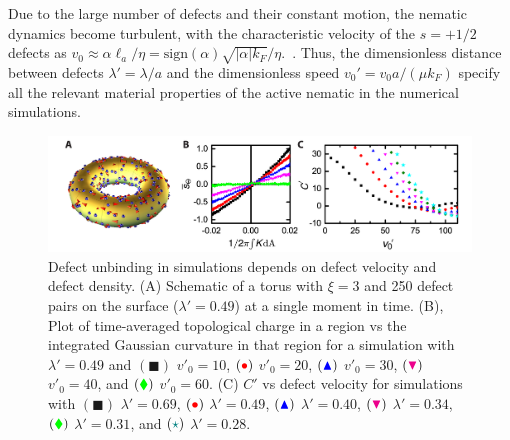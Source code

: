 Due to the large number of defects and their constant motion, the nematic dynamics become turbulent, with the characteristic velocity of the $s = +1/2$ defects as $v_0 \approx \alpha \ell_a/ \eta = \textrm{sign}(\alpha) \sqrt{|\alpha| k_F}/\eta$.~\cite{RN7, turbulentNematic}.
Thus, the dimensionless distance between defects $\lambda' = \lambda/a$ and the dimensionless speed $v_0' = v_0 a /(\mu k_F)$ specify all the relevant material properties of the active nematic in the numerical simulations.
\begin{figure}
  \centering
  \includegraphics{figures/C3/Ch3-Figs_SimDefectUnbinding.png}
  \caption{Defect unbinding in simulations depends on defect velocity and defect density.
  (A) Schematic of a torus with $\xi = 3$ and 250 defect pairs on the surface ($\lambda' = 0.49$) at a single moment in time.
  (B), Plot of time-averaged topological charge in a region vs the integrated Gaussian curvature  in that region for a simulation with $\lambda' = 0.49$ and
  $({\blacksquare})$ $v'_0 = 10$,
  $({\color{red} \bullet})$ $v'_0 = 20$,
  $({\color{blue} \blacktriangle})$ $v'_0 = 30$,
  $({\color{magenta} \blacktriangledown})$ $v'_0 = 40$, and
  $({\color{green} \blacklozenge})$ $v'_0 = 60$.
  (C) $C'$ vs defect velocity for simulations with
  $({\blacksquare})$ $\lambda' = 0.69$,
  $({\color{red} \bullet})$ $\lambda' = 0.49$,
  $({\color{blue} \blacktriangle})$ $\lambda' = 0.40$,
  $({\color{magenta} \blacktriangledown})$ $\lambda' = 0.34$,
  $({\color{green} \blacklozenge})$ $\lambda' = 0.31$, and
  $({\color{teal} \star})$ $\lambda' = 0.28$.}\label{f:3-SimDefectUnbinding}
\end{figure}

